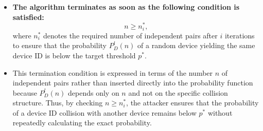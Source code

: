 \documentclass{report}
\begin{document}
\begin{itemize}
    \item \textbf{The algorithm terminates as soon as the following condition is satisfied:}
    \[
        n \ge n^*_i,
    \]
    where $n^*_i$ denotes the required number of independent pairs after $i$ iterations to ensure that the probability $P^l_D(n)$ of a random device yielding the same device ID is below the target threshold $p^*$. 
    
    \item This termination condition is expressed in terms of the number $n$ of independent pairs rather than inserted directly into the probability function because $P^l_D(n)$ depends only on $n$ and not on the specific collision structure. Thus, by checking $n \ge n^*_i$, the attacker ensures that the probability of a device ID collision with another device remains below $p^*$ without repeatedly calculating the exact probability.
\end{itemize}

\begin{center}
	\begin{minipage}[t]{0.5\textwidth}
		\vspace{0cm}

		
	\end{minipage}
\end{center}
\end{document}
